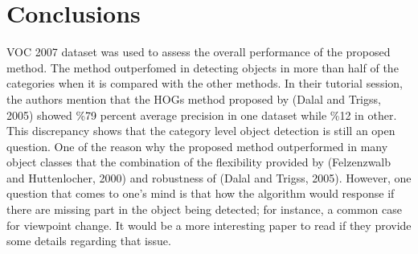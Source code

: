 \documentclass[11pt]{article}
\begin{document}
\section{Conclusions}
VOC 2007 dataset was used to assess the overall performance of the proposed method. The method outperfomed in detecting objects in more than half of the categories when it is compared with the other methods.
In their tutorial session, the authors mention that the HOGs method proposed by (Dalal and Trigss, 2005) showed \%79 percent average precision in one dataset while \%12 in other.
This discrepancy shows that the category level object detection is still an open question.
One of the reason why the proposed method outperformed in many object classes that the combination of the flexibility provided by (Felzenzwalb and Huttenlocher, 2000) and robustness of (Dalal and Trigss, 2005).
However, one question that comes to one's mind is that how the algorithm would response if there are missing part in the object being detected; for instance, a common case for viewpoint change.
It would be a more interesting paper to read if they provide some details regarding that issue.
% 
% 
\end{document}
